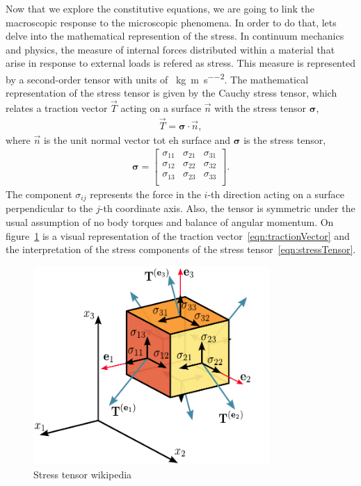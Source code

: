 Now that we explore the constitutive equations, we are going to link the macroscopic response to the microscopic phenomena.
In order to do that, lets delve into the mathematical represention of the stress.
In continuum mechanics and physics, the measure of internal forces distributed within a material that arise in response to external loads is refered as stress.
This measure is represented by a second-order tensor with units of \SI{}{\kilo\gram\per\meter\per\second\squared}.
The mathematical representation of the stress tensor is given by the Cauchy stress tensor, which relates a traction vector $\vec{T}$ acting on a surface $\vec{n}$ with the stress tensor $\bm{\sigma}$, %
\begin{gather}
    \vec{T} = \bm{\sigma}\cdot\vec{n},\label{eqn:tractionVector}
\end{gather}
where $\vec{n}$ is the unit normal vector tot eh surface and $\bm{\sigma}$ is the stress tensor,
\begin{gather*}
    \bm{\sigma} = 
    \begin{bmatrix}
        \sigma_{11} & \sigma_{21} & \sigma_{31} \\
        \sigma_{12} & \sigma_{22} & \sigma_{32} \\
        \sigma_{13} & \sigma_{23} & \sigma_{33} \\
    \end{bmatrix}.\label{eqn:stressTensor}
\end{gather*}
The component $\sigma_{ij}$ represents the force in the $i$-th direction acting on a surface perpendicular to the $j$-th coordinate axis.
Also, the tensor is symmetric under the usual assumption of no body torques and balance of angular momentum.
On figure~\ref{fig:stressTensor} is a visual representation of the traction vector~\eqref{eqn:tractionVector} and the interpretation of the stress components of the stress tensor~\eqref{eqn:stressTensor}. 
\begin{figure}[ht!]
    \centering
    \includegraphics[width=0.8\textwidth]{figs/Components_stress_tensor_cartesian.pdf}
    \caption{Stress tensor wikipedia}\label{fig:stressTensor}
\end{figure}

